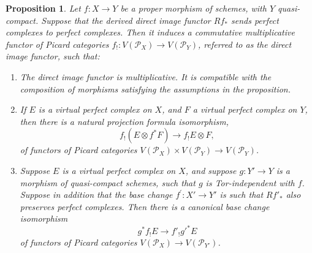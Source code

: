 \documentclass[11pt]{article}
\theoremstyle{plain}
\newtheorem{proposition}[theorem]{Proposition}
\theoremstyle{definition}
\newcommand{\Pcal}{\mathcal P}
\begin{document}
\begin{proposition}\label{prop:properties-direct-image-virtual}
Let $f: X\to Y$ be a proper morphism of schemes, with $Y$ quasi-compact. Suppose that the derived direct image functor $Rf_\ast$ sends perfect complexes to perfect complexes. Then it induces a commutative multiplicative functor of Picard categories $f_!: V(\Pcal_X) \to V(\Pcal_Y)$, referred to as the direct image functor, such that:
\begin{enumerate}
\item\label{item:properties-direct-image-virtual-1} The direct image functor is multiplicative. It is compatible with the composition of morphisms satisfying the assumptions in the proposition.
\item\label{item:properties-direct-image-virtual-2} If $E$ is a virtual perfect complex on $X$, and $F$ a virtual perfect complex on $Y$, then there is a natural projection formula isomorphism,
\begin{displaymath}
f_! \left(E \otimes f^\ast F\right)\to f_! E \otimes F,
\end{displaymath}
of functors of Picard categories $V(\Pcal_X) \times V(\Pcal_Y) \to V(\Pcal_Y)$.
\item\label{item:properties-direct-image-virtual-3} Suppose $E$ is a virtual perfect complex on $X$, and suppose $g \colon Y' \to Y$ is a morphism of quasi-compact schemes, such that $g$ is Tor-independent with $f$. Suppose in addition that the base change $f^\prime \colon X' \to Y'$ is such that $R{f'}_\ast$ also preserves perfect complexes. Then there is a canonical base change isomorphism
\begin{displaymath}
g^\ast f_! E \to f'_! {g'}^\ast E
\end{displaymath}
of functors of Picard categories $V(\Pcal_X) \to V(\Pcal_{Y'})$.
\end{enumerate}
\end{proposition}
\end{document}
